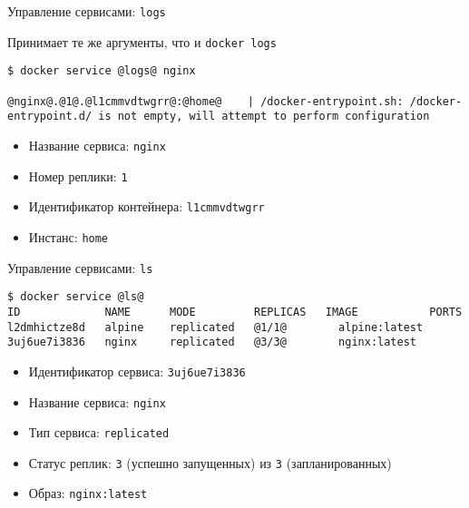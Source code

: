 \begin{frame}[fragile]{Управление сервисами: \texttt{logs} }

Принимает те же аргументы, что и \texttt{docker logs}

\begin{tcolorbox-code}
\begin{lstlisting}[style=base]
$ docker service @logs@ nginx

@nginx@.@1@.@l1cmmvdtwgrr@:@home@    | /docker-entrypoint.sh: /docker-entrypoint.d/ is not empty, will attempt to perform configuration
\end{lstlisting}
\end{tcolorbox-code}

\begin{itemize}
    \item Название сервиса: \texttt{nginx}
    \item Номер реплики: \texttt{1}
    \item Идентификатор контейнера: \texttt{l1cmmvdtwgrr}
    \item Инстанс: \texttt{home}
\end{itemize}

\end{frame}

\begin{frame}[fragile]{Управление сервисами: \texttt{ls} }

\begin{tcolorbox-code}
\begin{lstlisting}[style=base]
$ docker service @ls@
ID             NAME      MODE         REPLICAS   IMAGE           PORTS
l2dmhictze8d   alpine    replicated   @1/1@        alpine:latest   
3uj6ue7i3836   nginx     replicated   @3/3@        nginx:latest
\end{lstlisting}
\end{tcolorbox-code}

\begin{itemize}
    \item Идентификатор сервиса: \texttt{3uj6ue7i3836}
    \item Название сервиса: \texttt{nginx}
    \item Тип сервиса: \texttt{replicated}
    \item Статус реплик: \texttt{3} (успешно запущенных) из \texttt{3} (запланированных)
    \item Образ: \texttt{nginx:latest}
\end{itemize}

\end{frame}

